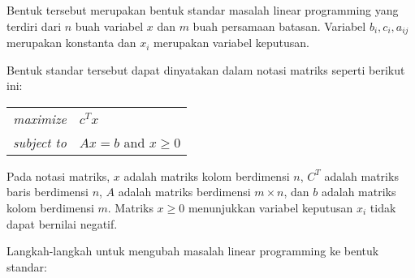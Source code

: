 Bentuk tersebut merupakan bentuk standar masalah linear programming yang terdiri dari $n$ buah variabel $x$ dan $m$ buah persamaan batasan. Variabel $b_i,c_i,a_{ij}$ merupakan konstanta dan $x_i$ merupakan variabel keputusan. 

Bentuk standar tersebut dapat dinyatakan dalam notasi matriks seperti berikut ini:
        
\begin{center}
	\begin{tabular}{r l}
    	\textit{maximize}   & $c^Tx$ \\
        \textit{subject to} & $Ax=b$ and $x\geq0$
	\end{tabular}    
\end{center}
        
Pada notasi matriks, $x$ adalah matriks kolom berdimensi $n$, $C^T$ adalah matriks baris berdimensi $n$, $A$ adalah matriks berdimensi $m\times n$, dan $b$ adalah matriks kolom berdimensi $m$. Matriks $x\geq0$ menunjukkan variabel keputusan $x_i$ tidak dapat bernilai negatif.
        
Langkah-langkah untuk mengubah masalah linear programming ke bentuk standar:

